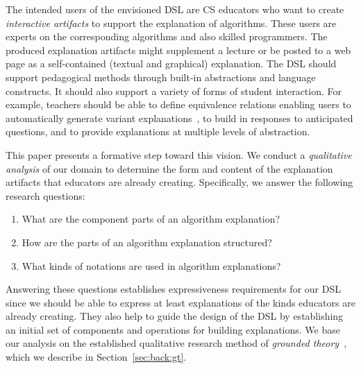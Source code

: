 \documentclass[sigconf]{acmart}
\begin{document}
The intended users of the envisioned DSL are CS educators who want to create
\emph{interactive artifacts} to support the explanation of algorithms. These
users are experts on the corresponding algorithms and also skilled
programmers. The produced explanation artifacts might supplement a lecture or
be posted to a web page as a self-contained (textual and graphical)
explanation.
%
The DSL should support pedagogical methods through built-in
abstractions and language constructs. It should also support a variety of forms
of student interaction. For example, teachers should be able to define
equivalence relations enabling users to automatically generate variant
explanations~\cite{EW13jvlc}, to build in responses to anticipated
questions, and to provide explanations at multiple levels of abstraction.


This paper presents a formative step toward this vision. We conduct a
\emph{qualitative analysis} of our domain to determine the form and content of
the explanation artifacts that educators are already creating.
%
Specifically, we answer the following research questions:
%
\begin{enumerate}[label=RQ\arabic*.,ref=RQ\arabic*,leftmargin=*]

\item \label{rq:parts}
%
What are the component parts of an algorithm explanation?

\item \label{rq:structure}
%
How are the parts of an algorithm explanation structured?

\item \label{rq:notations}
%
What kinds of notations are used in algorithm explanations?

\end{enumerate}
%
Answering these questions establishes expressiveness requirements for our DSL
since we should be able to express at least explanations of the kinds educators
are already creating. They also help to guide the design of the DSL by
establishing an initial set of components and operations for building
explanations.
%
We base our analysis on the established qualitative research method of
\emph{grounded theory}~\cite{Strauss67discoveryof}, which we describe in
Section~\ref{sec:back:gt}.
\end{document}
